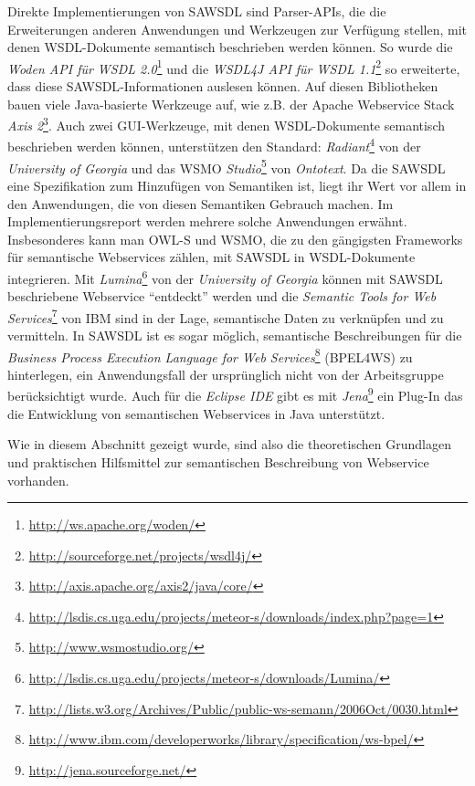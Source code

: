 Direkte Implementierungen von \ac{SAWSDL} sind Parser-APIs, die die Erweiterungen anderen Anwendungen und Werkzeugen zur Verfügung stellen, mit denen \ac{WSDL}-Dokumente semantisch beschrieben werden können. So wurde die \emph{Woden API für WSDL 2.0}\footnote{\url{http://ws.apache.org/woden/}} und die \emph{WSDL4J API für WSDL
1.1}\footnote{\url{http://sourceforge.net/projects/wsdl4j/}} so erweiterte, dass diese \ac{SAWSDL}-Informationen auslesen können. Auf diesen Bibliotheken bauen viele Java-basierte Werkzeuge auf, wie z.B. der Apache Webservice Stack \emph{Axis 2}\footnote{\url{http://axis.apache.org/axis2/java/core/}}. Auch zwei GUI-Werkzeuge, mit denen \ac{WSDL}-Dokumente semantisch beschrieben werden können, unterstützen den Standard: \emph{Radiant}\footnote{\url{http://lsdis.cs.uga.edu/projects/meteor-s/downloads/index.php?page=1}} von der \emph{University of Georgia} und das \acl{WSMO} \emph{Studio}\footnote{\url{http://www.wsmostudio.org/}} von \emph{Ontotext}. Da die \ac{SAWSDL} eine Spezifikation zum Hinzufügen von Semantiken ist, liegt ihr Wert vor allem in den Anwendungen, die von diesen Semantiken Gebrauch machen. Im Implementierungsreport werden mehrere solche Anwendungen erwähnt.
Insbesonderes kann man \ac{OWL-S} und \ac{WSMO}, die zu den gängigsten Frameworks für semantische Webservices zählen,  mit \ac{SAWSDL} in \ac{WSDL}-Dokumente integrieren. Mit \emph{Lumina}\footnote{\url{http://lsdis.cs.uga.edu/projects/meteor-s/downloads/Lumina/}} von der \emph{University of Georgia} können mit \ac{SAWSDL} beschriebene Webservice "`entdeckt"' werden und die \emph{Semantic Tools for Web Services}\footnote{\url{http://lists.w3.org/Archives/Public/public-ws-semann/2006Oct/0030.html}} von IBM sind in der Lage, semantische Daten zu verknüpfen und zu vermitteln.
In \ac{SAWSDL} ist es sogar möglich, semantische Beschreibungen für die \emph{Business Process Execution Language for Web Services}\footnote{\url{http://www.ibm.com/developerworks/library/specification/ws-bpel/}} (BPEL4WS) zu hinterlegen, ein Anwendungsfall der ursprünglich nicht von der Arbeitsgruppe berücksichtigt wurde. \cite[S.63]{ky-sawsdl} Auch für die \emph{Eclipse IDE} gibt es mit \emph{Jena}\footnote{\url{http://jena.sourceforge.net/}} ein Plug-In das die Entwicklung von semantischen Webservices in Java unterstützt.

\bigskip

Wie in diesem Abschnitt gezeigt wurde, sind also die theoretischen Grundlagen und praktischen Hilfsmittel zur semantischen Beschreibung von Webservice vorhanden.
